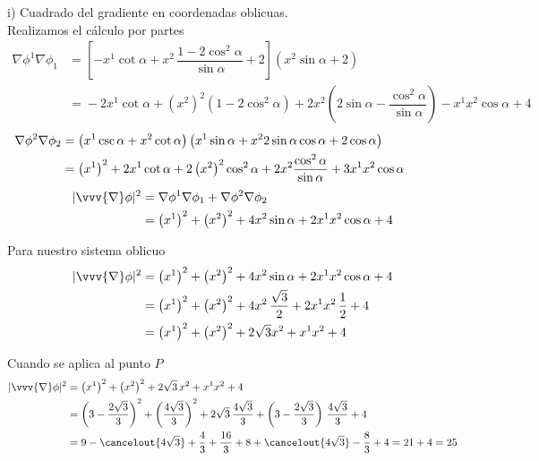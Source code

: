 \noindent
i) Cuadrado del gradiente en coordenadas oblicuas.\\

Realizamos el cálculo por partes
\begin{align*}
    \nabla\phi^1\nabla\phi_1
  &=
    \left[%
    -x^1\cot\alpha
    + x^2\,\dfrac{1-2\cos^2\alpha}{\sin\alpha}
    + 2
    \right]
    \left(%
    x^2\sin\alpha + 2
    \right)\\
  &\!=
    \!- 2x^1\!\cot\alpha
    +\!\left(x^2\right)^2\!\left(1-2\cos^2\alpha\right)
    \!+ 2x^2\!\left(\!2\sin\alpha - \dfrac{\cos^2\alpha}{\sin\alpha}\right)\!
    -x^1x^2\cos\alpha
    + 4
\end{align*}
\begin{align*}
  \hspace*{-5em}
  \nabla\phi^2\nabla\phi_2
  &=
    \left(x^1\csc\alpha + x^2 \cot\alpha\right)
    \left(x^1\sin\alpha + x^2 2\sin\alpha\cos\alpha + 2 \cos\alpha\right)\\
  &=
    \left(x^1\right)^2
    + 2x^1\cot\alpha
    + 2\left(x^2\right)^2\cos^2\alpha
    + 2x^2\dfrac{\cos^2\alpha}{\sin\alpha}
    + 3x^1x^2\cos\alpha
\end{align*}
\begin{align*}
  |\vvv{\nabla}\phi|^2
  &=
    \nabla\phi^1\nabla\phi_1 + \nabla\phi^2\nabla\phi_2\\
  &=
    \left(x^1\right)^2
    + \left(x^2\right)^2
    + 4x^2\sin\alpha
    + 2x^1x^2\cos\alpha
    + 4
\end{align*}

Para nuestro sistema oblicuo
\begin{align*}
  |\vvv{\nabla}\phi|^2
  &=
    \left(x^1\right)^2
    + \left(x^2\right)^2
    + 4x^2\sin\alpha
    + 2x^1x^2\cos\alpha
    + 4\\
  &=
    \left(x^1\right)^2
    + \left(x^2\right)^2
    + 4x^2\,\dfrac{\sqrt{3}}{2}
    + 2x^1x^2\,\dfrac{1}{2}
    + 4\\
  &=
    \left(x^1\right)^2
    + \left(x^2\right)^2
    + 2\sqrt{3} x^2
    + x^1 x^2
    + 4
\end{align*}

Cuando se aplica al punto $P$
\begin{align*}
  |\vvv{\nabla}\phi|^2
  &=
    \left(x^1\right)^2
    + \left(x^2\right)^2
    + 2\sqrt{3}\, x^2
    + x^1 x^2
    + 4\\
  &=
    \left(3-\dfrac{2\sqrt{3}}{3}\right)^2
    + \left(\dfrac{4\sqrt{3}}{3}\right)^2
    + 2\sqrt{3}\,\dfrac{4\sqrt{3}}{3}
    + \left(3-\dfrac{2\sqrt{3}}{3}\right)\,\dfrac{4\sqrt{3}}{3}
    + 4\\
  &=
    9
    - \cancelout{4\sqrt{3}}
    + \dfrac{4}{3}
    + \dfrac{16}{3}
    + 8
    + \cancelout{4\sqrt{3}}
    - \dfrac{8}{3}
    + 4
    = 21 + 4
    = 25
\end{align*}

